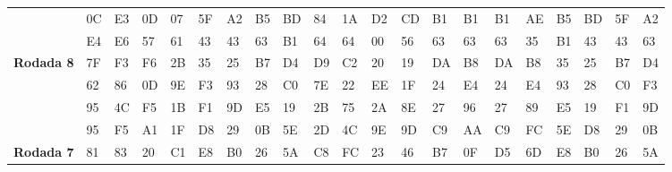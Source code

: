 \documentclass[
    article,            %
    11pt,               %
    oneside,            %
    a4paper,            %
    english,            %
    brazil,             %
    sumario=tradicional,
    ]{abntex2}
\begin{document}
\begin{table}[H]
{\begin{tabular}{|
>{\columncolor[HTML]{C0C0C0}}l |llll|llll|llll|llll|llll|}
\textbf{}          & 0C              & E3              & 0D              & 07              & 5F             & A2             & B5            & BD            & 84             & 1A            & D2            & CD            & B1              & B1             & B1             & AE             & B5             & BD             & 5F             & A2            \\
\textbf{}          & E4              & E6              & 57              & 61              & 43             & 43             & 63            & B1            & 64             & 64            & 00            & 56            & 63              & 63             & 63             & 35             & B1             & 43             & 43             & 63            \\ \hline
\textbf{Rodada 8}  & 7F              & F3              & F6              & 2B              & 35             & 25             & B7            & D4            & D9             & C2            & 20            & 19            & DA              & B8             & DA             & B8             & 35             & 25             & B7             & D4            \\
\textbf{}          & 62              & 86              & 0D              & 9E              & F3             & 93             & 28            & C0            & 7E             & 22            & EE            & 1F            & 24              & E4             & 24             & E4             & 93             & 28             & C0             & F3            \\
\textbf{}          & 95              & 4C              & F5              & 1B              & F1             & 9D             & E5            & 19            & 2B             & 75            & 2A            & 8E            & 27              & 96             & 27             & 89             & E5             & 19             & F1             & 9D            \\
\textbf{}          & 95              & F5              & A1              & 1F              & D8             & 29             & 0B            & 5E            & 2D             & 4C            & 9E            & 9D            & C9              & AA             & C9             & FC             & 5E             & D8             & 29             & 0B            \\ \hline
\textbf{Rodada 7}  & 81              & 83              & 20              & C1              & E8             & B0             & 26            & 5A            & C8             & FC            & 23            & 46            & B7              & 0F             & D5             & 6D             & E8             & B0             & 26             & 5A            \\

\end{tabular}}
\end{table}
\end{document}
